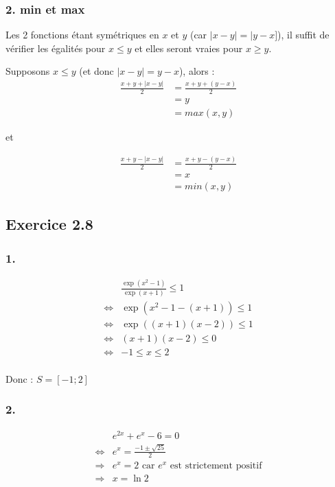 \documentclass{report}
\begin{document}
\subsubsection*{2. min et max}

Les 2 fonctions étant symétriques en $x$ et $y$ (car $|x-y| = |y-x]$), il suffit de vérifier les égalités
pour $x \leq y$ et elles seront vraies pour $x \geq y$.

Supposons $x \leq y$ (et donc $|x-y|=y-x$), alors :
\begin{equation*}
	\begin{split}
		\frac{x + y + |x-y|}{2} &= \frac{x + y + (y-x)}{2} \\
		                        &= y \\
		                        &= max(x,y)
	\end{split}
\end{equation*}

et

\begin{equation*}
	\begin{split}
		\frac{x + y - |x-y|}{2} &= \frac{x + y - (y-x)}{2} \\
		&= x \\
		&= min(x,y)
	\end{split}
\end{equation*}

\subsection*{Exercice 2.8}

\subsubsection*{1.}
\begin{equation*}
	\begin{split}
		&\frac{\exp(x^2-1)}{\exp(x+1)} \leq 1 \\
		\Longleftrightarrow &\exp(x^2-1 -(x+1)) \leq 1 \\
		\Longleftrightarrow &\exp((x+1)(x-2)) \leq 1 \\
		\Longleftrightarrow &(x+1)(x-2) \leq 0 \\
		\Longleftrightarrow & -1 \leq x \leq 2 \\
	\end{split}
\end{equation*}

Donc : $S= [-1 ; 2]$

\subsubsection*{2.}
\begin{equation*}
	\begin{split}
		& e^{2x} + e^x -6 = 0 \\
		\Longleftrightarrow & e^x = \frac{-1\pm \sqrt{25}}{2} \\
		\Longrightarrow & e^x = 2 \text{ car $e^x$ est strictement positif} \\
		\Longrightarrow & x = \ln 2
	\end{split}
\end{equation*}
\end{document}
